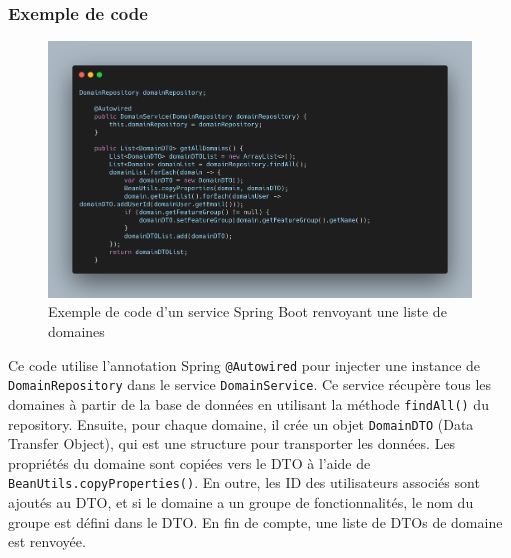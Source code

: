 \documentclass[a4paper, 11pt]{report}
\begin{document}
\subsubsection{Exemple de code}
  \begin{figure}[H]
      \centering
      \includegraphics[scale=0.40,center]{screenshots/java-code.png}
      \caption{Exemple de code d'un service Spring Boot renvoyant une liste de domaines}
  \end{figure}
Ce code utilise l'annotation Spring \texttt{@Autowired} pour injecter une instance
de \texttt{DomainRepository} dans le service \texttt{DomainService}. Ce
service récupère tous les domaines à partir de la base de données en
utilisant la méthode \texttt{findAll()} du repository. Ensuite, pour
chaque domaine, il crée un objet \texttt{DomainDTO} (Data Transfer
Object), qui est une structure pour transporter les données. Les
propriétés du domaine sont copiées vers le DTO à l'aide de
\texttt{BeanUtils.copyProperties()}. En outre, les ID des utilisateurs
associés sont ajoutés au DTO, et si le domaine a un groupe de
fonctionnalités, le nom du groupe est défini dans le DTO. En fin de
compte, une liste de DTOs de domaine est renvoyée.
\end{document}
